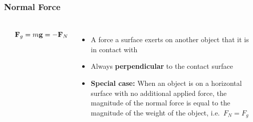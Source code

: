 \documentclass[12pt,compress,aspectratio=169]{beamer}
\newcommand{\mb}[1]{\ensuremath\mathbf{#1}}
\begin{document}
\begin{frame}
  \frametitle{Normal Force}
  \begin{columns}
    \begin{center}
    \end{center}
    \begin{displaymath}
      \mb{F}_g=m\mb{g}=-\mb{F}_N
    \end{displaymath}
    
    \begin{itemize}
    \item A force a surface exerts on another object that it is in contact with
    \item Always \textbf{perpendicular} to the contact surface
    \item\textbf{Special case:} When an object is on a horizontal surface
      with no additional applied force, the magnitude of the normal force is
      equal to the magnitude of the weight of the object, i.e.\ $F_N=F_g$
    \end{itemize}
  \end{columns}
\end{frame}
\end{document}
